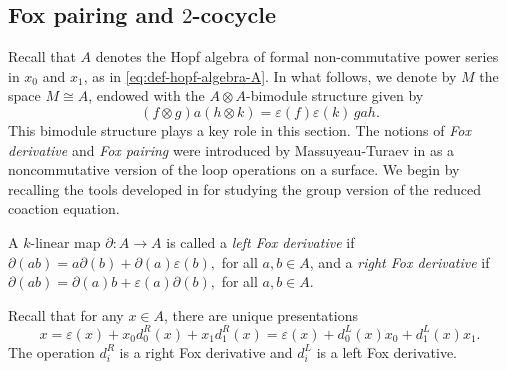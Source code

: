 \documentclass[a4paper,fleqn]{cas-sc}
\newcommand{\kk}{k\langle \langle x_0, x_1 \rangle \rangle}
\DeclareMathOperator{\conc}{conc}
\begin{document}
\subsection{Fox pairing and $2$-cocycle} \label{subsection:3_1}
Recall that $A$ denotes the Hopf algebra of formal non-commutative power series in $x_0$ and $x_1$, as in \eqref{eq:def-hopf-algebra-A}.
In what follows, we denote by $M$ the space $M \cong A$, endowed with the $A \otimes A$-bimodule structure given by
	\begin{equation}\label{eq:bimodule}
	   (f \otimes g) a (h \otimes k) = \varepsilon(f)\varepsilon(k) \, gah.
	\end{equation}
This bimodule structure plays a key role in this section. The notions of \textit{Fox derivative} and \textit{Fox pairing} were introduced by Massuyeau-Turaev in \cite{Massuyeau2014} as a noncommutative version of the loop operations on a surface. We begin by recalling the tools developed in \cite{ANR} for studying the group version of the reduced coaction equation.

\begin{definition}
	A $k$-linear map $\partial: A\to A$ is called a \textit{left Fox derivative} if
	$\partial(ab)=a\partial(b)+\partial(a)\varepsilon(b),$
	for all $a,b\in A$, and a \textit{right Fox derivative} if
	$\partial(ab)=\partial(a)b+\varepsilon(a)\partial(b),
	$ for all $a,b\in A$.
\end{definition}

\begin{ex}
\label{example:left_right fox deri}
	Recall that for any $x\in A$, there are unique presentations
	$$
    x =\varepsilon(x)+ x_0 d^R_0(x) + x_1 d^R_1(x)
    =\varepsilon(x)+ d^{L}_0(x) x_0 + d^{L}_1 (x)x_1.
    $$
	The operation $d^{R}_i$ is a right Fox derivative and $d^L_i$ is a left Fox derivative.
\end{ex}
\end{document}
